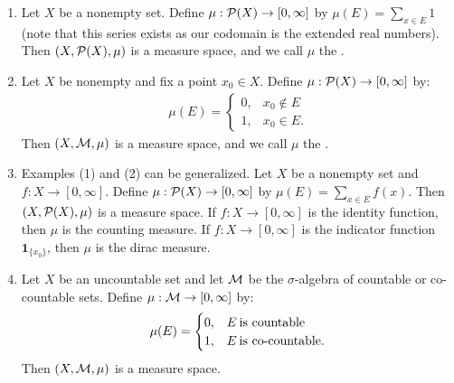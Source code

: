     \begin{example}
        \phantom{a}
        \begin{enumerate}[label = (\arabic*),itemsep=1pt,topsep=3pt]
            \item Let $X$ be a nonempty set. Define $\mu:\cP(X) \rightarrow [0,\infty]$ by $\mu(E) = \sum_{x \in E}1$ (note that this series exists as our codomain is the extended real numbers). Then $(X,\cP(X),\mu)$ is a measure space, and we call $\mu$ the .
            
            \item Let $X$ be nonempty and fix a point $x_0 \in X$. Define $\mu:\cP(X) \rightarrow [0,\infty]$ by:
                \begin{equation*}
                \begin{split}
                    \mu(E) = \begin{cases}
                        0,& x_0 \not\in E \\
                        1,& x_0 \in E.
                    \end{cases}
                \end{split}
                \end{equation*}
            Then $(X,\cM,\mu)$ is a measure space, and we call $\mu$ the .

            \item Examples (1) and (2) can be generalized. Let $X$ be a nonempty set and $f:X \rightarrow [0,\infty]$. Define $\mu:\cP(X) \rightarrow [0,\infty]$ by $\mu(E) = \sum_{x \in E}f(x)$. Then $(X,\cP(X),\mu)$ is a measure space. If $f:X \rightarrow [0,\infty]$ is the identity function, then $\mu$ is the counting measure. If $f:X \rightarrow [0,\infty]$ is the indicator function $\mathbf{1}_{\{x_0\}}$, then $\mu$ is the dirac measure.
            
            \item Let $X$ be an uncountable set and let $\cM$ be the $\sigma$-algebra of countable or co-countable sets. Define $\mu:\cM \rightarrow [0,\infty]$ by:
                \begin{equation*}
                \begin{split}
                    \mu(E) = \begin{cases}
                        0, & E\h2\text{is countable}\\
                        1, & E\h2\text{is co-countable}.
                    \end{cases}
                \end{split}
                \end{equation*}
            Then $(X,\cM,\mu)$ is a measure space.
        \end{enumerate}
    \end{example}

